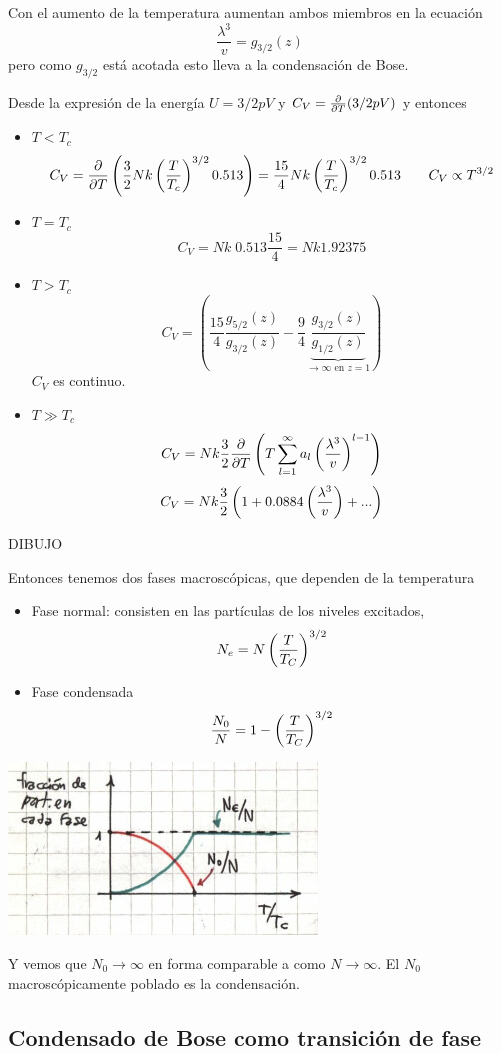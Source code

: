 \documentclass[10pt,oneside]{CBFT_book}
\begin{document}
Con el aumento de la temperatura aumentan ambos miembros en la ecuación 
\[
	\frac{\lambda^3}{v} = g_{3/2}(z)
\]
pero como $g_{3/2}$ está acotada esto lleva a la condensación de Bose.

Desde la expresión de la energía $ U = 3/2 p V $ y $C_V = \frac{\partial^{\hspace{-0.05em}} {}}{\partial {T}^{\hspace{-0.05em}}}(3/2 p V)$
y entonces
\begin{itemize}
 \item $ T < T_c $ 
 \[
	C_V = \frac{\partial^{\hspace{-0.05em}} {}}{\partial {T}^{\hspace{-0.05em}}}\left( \frac{3}{2} N k \left( \frac{ T }{ T_c } \right)^{3/2} 0.513  \right) = 
	\frac{15}{4} N k \left( \frac{ T }{ T_c } \right)^{3/2} 0.513 \qquad C_V \propto T^{3/2}
 \]
 \item $ T = T_c $ 
 \[
	C_V = N k \; 0.513 \frac{15}{4} = N k 1.92375
 \]
 \item $ T > T_c $ 
 \[
	C_V = \left( \frac{15}{4}\frac{ g_{5/2}(z) }{ g_{3/2}(z) } - 
	\frac{9}{4} \underbrace{\frac{ g_{3/2}(z) }{ g_{1/2}(z) }}_{\to \infty \text{ en } z=1} \right)
 \]
 $C_V$ es continuo.
 \item $ T \gg T_c $ 
 \[
	C_V = N k \frac{3}{2} \frac{\partial^{\hspace{-0.05em}} {}}{\partial {T}^{\hspace{-0.05em}}} \left( T \sum_{l=1}^\infty a_l \left( \frac{ \lambda^3 }{ v } \right)^{l-1} \right)
 \]
 \[
	C_V = N k \frac{3}{2} \left( 1 + 0.0884 \left( \frac{ \lambda^3 }{ v } \right) + ... \right)
 \]
\end{itemize}

DIBUJO

Entonces tenemos dos fases macroscópicas, que dependen de la temperatura
\begin{itemize}
 \item Fase normal: consisten en las partículas de los niveles excitados,
 \[
	N_e = N \left( \frac{ T }{ T_C } \right)^{3/2}
 \]
 \item Fase condensada
 \[
	\frac{N_0}{N} = 1 - \left( \frac{ T }{ T_C } \right)^{3/2}
 \]
\end{itemize}

\includegraphics[scale=0.5]{images/1606329628.jpg}

Y vemos que $N_0 \to \infty$ en forma comparable a como $N \to \infty$. El $N_0$ macroscópicamente poblado
es la condensación.

\subsection{Condensado de Bose como transición de fase}
\end{document}

